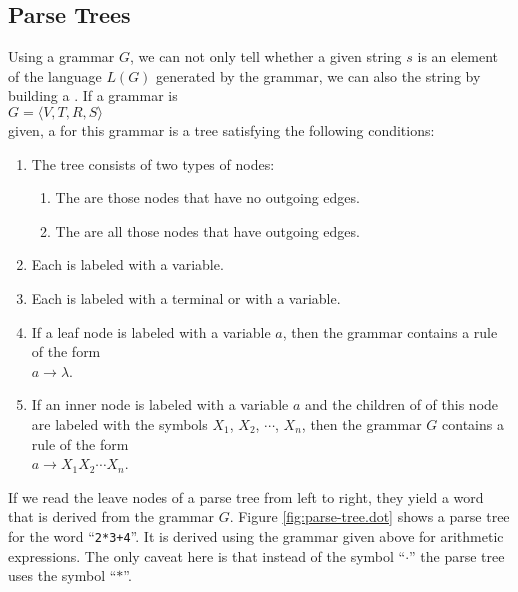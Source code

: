 \subsection{Parse Trees}
Using a grammar $G$, we can not only tell whether a given string $s$ is an
element of the language $L(G)$ generated by the grammar, we can also  the string
by building a .  If a grammar is
\\[0.2cm]
\hspace*{1.3cm}
$G = \langle V, T, R, S \rangle$
\\[0.2cm]
given, a  for this grammar is a tree satisfying the following
conditions:
\begin{enumerate}
\item The tree consists of two types of nodes:
      \begin{enumerate}
      \item The  are those nodes that have no outgoing edges.
      \item The  are all those nodes that have outgoing edges.
      \end{enumerate}
\item Each  is labeled with a variable.
\item Each  is labeled with a terminal or with a variable.
\item If a leaf node is labeled with a variable $a$, then the grammar contains a 
      rule of the form
      \\[0.2cm]
      \hspace*{1.3cm}
      $a \rightarrow \lambda$.
\item If an inner node is labeled with a variable $a$ and the children of
      of this node are labeled with the symbols $X_1$, $X_2$, $\cdots$, $X_n$, then
      the grammar $G$ contains a rule of the form 
      \\[0.2cm]
      \hspace*{1.3cm}
      $a \rightarrow X_1 X_2 \cdots X_n$.
\end{enumerate}
If we read the leave nodes of a parse tree from left to right,  they yield a word
that is derived from the grammar $G$.  Figure \ref{fig:parse-tree.dot} shows a
parse tree for the word ``\texttt{2*3+4}''.  It is derived using the grammar given above for
arithmetic expressions.  The only caveat here is that instead of the symbol ``$\cdot$'' the parse tree uses the
symbol ``$*$''.

